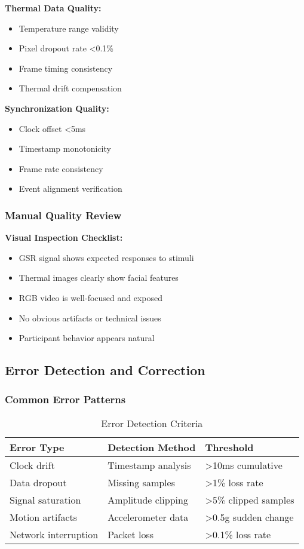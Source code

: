 \textbf{Thermal Data Quality:}
\begin{itemize}
\item Temperature range validity
\item Pixel dropout rate <0.1\%
\item Frame timing consistency
\item Thermal drift compensation
\end{itemize}

\textbf{Synchronization Quality:}
\begin{itemize}
\item Clock offset <5ms
\item Timestamp monotonicity
\item Frame rate consistency
\item Event alignment verification
\end{itemize}

\subsubsection{Manual Quality Review}

\textbf{Visual Inspection Checklist:}
\begin{itemize}
\item GSR signal shows expected responses to stimuli
\item Thermal images clearly show facial features
\item RGB video is well-focused and exposed
\item No obvious artifacts or technical issues
\item Participant behavior appears natural
\end{itemize}

\subsection{Error Detection and Correction}

\subsubsection{Common Error Patterns}

\begin{table}[htbp]
\centering
\caption{Error Detection Criteria}
\begin{tabular}{|l|l|l|}
\hline
\textbf{Error Type} & \textbf{Detection Method} & \textbf{Threshold} \\
\hline
Clock drift & Timestamp analysis & >10ms cumulative \\
Data dropout & Missing samples & >1\% loss rate \\
Signal saturation & Amplitude clipping & >5\% clipped samples \\
Motion artifacts & Accelerometer data & >0.5g sudden change \\
Network interruption & Packet loss & >0.1\% loss rate \\
\hline
\end{tabular}
\end{table}

